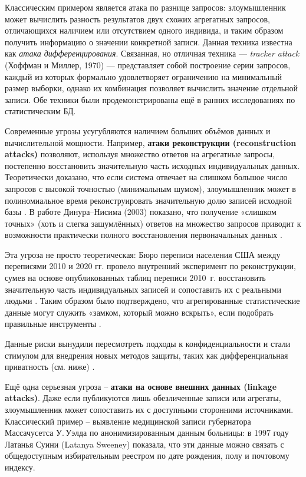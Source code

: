 Классическим примером является атака по разнице запросов: злоумышленник может вычислить
разность результатов двух схожих агрегатных запросов, отличающихся наличием или
отсутствием одного индивида, и таким образом получить информацию о значении конкретной
записи. Данная техника известна как \textit{атака дифференцирования}. Связанная, но
отличная техника — \textit{tracker attack} (Хоффман и Миллер, 1970) \autocite{denning1979tracker} — представляет собой
построение серии запросов, каждый из которых формально удовлетворяет ограничению на
минимальный размер выборки, однако их комбинация позволяет вычислить значение отдельной
записи. Обе техники были продемонстрированы ещё в ранних исследованиях по статистическим БД.

Современные угрозы усугубляются наличием больших объёмов данных и вычислительной мощности.
Например, \textbf{атаки реконструкции (reconstruction attacks)} позволяют, используя
множество ответов на агрегатные запросы, постепенно восстановить значительную часть
исходных индивидуальных данных. Теоретически доказано, что если система отвечает на
слишком большое число запросов с высокой точностью (минимальным шумом), злоумышленник
может в полиномиальное время реконструировать значительную долю записей исходной базы
\autocite{differentialprivacy-org}. В работе Динура–Нисима (2003) показано, что получение
«слишком точных» (хоть и слегка зашумлённых) ответов на множество запросов приводит к
возможности практически полного восстановления первоначальных данных
\autocite{differentialprivacy-org}.

Эта угроза не просто теоретическая: Бюро переписи населения США между переписями 2010 и
2020 гг. провело внутренний эксперимент по реконструкции, сумев на основе опубликованных
таблиц переписи 2010~г. восстановить значительную часть индивидуальных записей и
сопоставить их с реальными людьми \autocite{cornell-edu}. Таким образом было подтверждено,
что агрегированные статистические данные могут служить «замком, который можно вскрыть»,
если подобрать правильные инструменты \autocite{cornell-edu}.

Данные риски вынудили пересмотреть подходы к конфиденциальности и стали стимулом для
внедрения новых методов защиты, таких как дифференциальная приватность (см. ниже)
\autocite{cornell-edu}.

Ещё одна серьезная угроза – \textbf{атаки на основе внешних данных (linkage attacks)}.
Даже если публикуются лишь обезличенные записи или агрегаты, злоумышленник может
сопоставить их с доступными сторонними источниками. Классический пример – выявление
медицинской записи губернатора Массачусетса У.\,Уэлда по анонимизированным данным больницы:
в 1997 году Латанья Суини (Latanya Sweeney) \autocite{sweeney2015} показала, что эти данные можно связать с
общедоступным избирательным реестром по дате рождения, полу и почтовому индексу.

